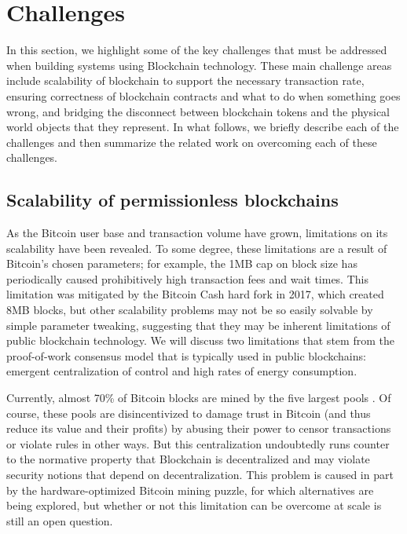 
\section{Challenges}
\label{sec:challenges}

In this section, we highlight some of the key challenges that must be addressed when building systems using Blockchain technology.  These main challenge areas include scalability of blockchain to support the necessary transaction rate, ensuring correctness of blockchain contracts and what to do when something goes wrong, and bridging the disconnect between blockchain tokens and the physical world objects that they represent.  In what follows, we briefly describe each of the challenges and then summarize the related work on overcoming each of these challenges.

\subsection{Scalability of permissionless blockchains}
As the Bitcoin user base and transaction volume have grown, limitations on its scalability have been revealed. To some degree, these limitations are a result of Bitcoin's chosen parameters; for example, the 1MB cap on block size has periodically caused prohibitively high transaction fees and wait times. This limitation was mitigated by the Bitcoin Cash hard fork in 2017, which created 8MB blocks, but other scalability problems may not be so easily solvable by simple parameter tweaking, suggesting that they may be inherent limitations of public blockchain technology. We will discuss two limitations that stem from the proof-of-work consensus model that is typically used in public blockchains: emergent centralization of control and high rates of energy consumption.

Currently, almost 70\% of Bitcoin blocks are mined by the five largest pools \cite{BlockchainInfoPools}. Of course, these pools are disincentivized to damage trust in Bitcoin (and thus reduce its value and their profits) by abusing their power to censor transactions or violate rules in other ways. But this centralization undoubtedly runs counter to the normative property that Blockchain is decentralized and may violate security notions that depend on decentralization. This problem is caused in part by the hardware-optimized Bitcoin mining puzzle, for which alternatives are being explored, but whether or not this limitation can be overcome at scale is still an open question.

